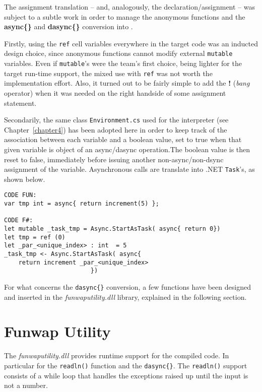 The assignment translation -- and, analogously, the declaration/assignment -- was subject to a subtle work in order to manage the anonymous functions and the \textbf{async\{\}} and \textbf{dasync\{\}} conversion into \fsharp. 

Firstly, using the \texttt{ref} cell variables everywhere in the target code was an inducted design choice, since \fsharp anonymous functions cannot modify external \texttt{mutable} variables. Even if \texttt{mutable}'s were the team's first choice, being lighter for the target run-time support, the mixed use with \texttt{ref} was not worth the implementation effort. Also, it turned out to be fairly simple to add the \textbf{!} (\textit{bang} operator) when it was needed on the right handside of some assignment statement.

Secondarily, the same class \texttt{Environment.cs} used for the interpreter (see Chapter~\ref{chapter4}) has been adopted here in order to keep track of the association between each variable and a boolean value, set to true when that given variable is object of an async/dasync operation.The boolean value is then reset to false, immediately before issuing another non-async/non-dsync assignment of the variable. Asynchronous calls are translate into .NET \texttt{Task}'s, as shown below.

\begin{lstlisting}[caption=Example of \texttt{async\{\}} block translation.]
CODE FUN:
var tmp int = async{ return increment(5) };

CODE F#:
let mutable _task_tmp = Async.StartAsTask( async{ return 0})
let tmp = ref (0)
let _par_<unique_index> : int  = 5
_task_tmp <- Async.StartAsTask( async{
	return increment _par_<unique_index>
						})
\end{lstlisting}

For what concerns the \texttt{dasync\{\}} conversion, a few functions have been designed and inserted in the \textit{funwaputility.dll} library, explained in the following section.

\section{Funwap Utility}
The \textit{funwaputility.dll} provides \fsharp runtime support for the compiled code. In particular for the \texttt{readln()} function and the \texttt{dasync\{\}}. The \texttt{readln()}  support consists of a while loop that handles the exceptions raised up until the input is not a number.\\

